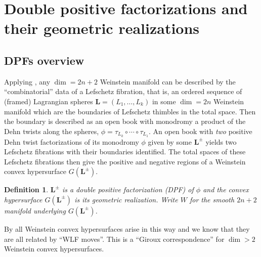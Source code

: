 \documentclass[11pt]{amsart}
\newcommand{\thicc}[1]{\pmb{#1}}
\newcommand{\LagTuple}{\thicc{L}}
\newtheorem{ex}[thm]{Example}
\newtheorem{defn}[thm]{Definition}
\begin{document}
\section{Double positive factorizations and their geometric realizations}

\subsection{DPFs overview}

Applying \cite{BHH:GirouxCorrespondence, GirouxPardon}, any $\dim = 2n+2$ Weinstein manifold can be described by the ``combinatorial'' data of a Lefschetz fibration, that is, an ordered sequence of (framed) Lagrangian spheres $\LagTuple = (L_{1}, \dots, L_{k})$ in some $\dim=2n$ Weinstein manifold which are the boundaries of Lefschetz thimbles in the total space. Then the boundary is described as an open book with monodromy a product of the Dehn twists along the spheres, $\phi = \tau_{L_{k}}\circ \cdots \circ \tau_{L_{1}}$. An open book with \emph{two} positive Dehn twist factorizations of its monodromy $\phi$ given by some $\LagTuple^{\pm}$ yields two Lefschetz fibrations with their boundaries identified. The total spaces of these Lefschetz fibrations then give the positive and negative regions of a Weinstein convex hypersurface $G(\LagTuple^{\pm})$. 

\begin{defn}
$\LagTuple^{\pm}$ is a \emph{double positive factorization} (DPF) of $\phi$ and the convex hypersurface $G(\LagTuple^{\pm})$ is its \emph{geometric realization}. Write $W$ for the smooth $2n+2$ manifold underlying $G(\LagTuple^{\pm})$.
\end{defn}

By \cite{BHH:GirouxCorrespondence} all Weinstein convex hypersurfaces arise in this way and we know that they are all related by ``WLF moves''. This is a ``Giroux correspondence'' for $\dim > 2$ Weinstein convex hypersurfaces.

\begin{comment}
\begin{ex}
Suppose that $\mu$ and $\lambda$ are meridian and longitude circles on a punctured torus $T \setminus \{ pt \}$. Then $\LagTuple^{+} = (\mu, \lambda, \mu)$ and $\LagTuple^{-} = (\lambda, \mu, \lambda)$ give a DPF, determining a $\dim=4$ convex hypersurface. Indeed $\tau_{\mu}\tau_{\lambda}\tau_{\mu} = \tau_{\lambda}\tau_{\mu}\tau_{\lambda}$ is the classical braid relation. This can be generalized to higher dimensions by looking at matching paths in $A_{3}$ Milnor fibers.
\end{ex}
\end{comment}
\end{document}
